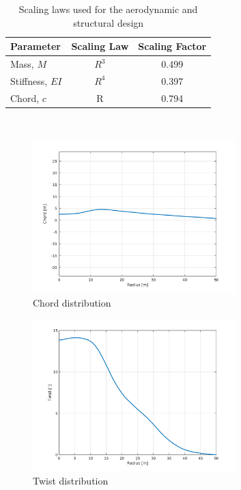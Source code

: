 \begin{table}[h]
\centering
\caption{Scaling laws used for the aerodynamic and structural design}
\label{tab:aero_struct_scaling}
\begin{tabular}{ |l|c|c| } 
\hline
\textbf{Parameter} & \textbf{Scaling Law} & \textbf{Scaling Factor}\\ 
\hline
Mass, $M$ & $R^3$ & 0.499 \\
\hline
Stiffness, $EI$ & $R^4$ & 0.397 \\
\hline
Chord, $c$ & R & 0.794\\
\hline
\end{tabular} \\
\end{table}

\begin{figure}[H]
\centering
\includegraphics[width=0.7\textwidth]{Images/chord.png} 
\caption{Chord distribution}\label{fig:chord}
\end{figure}

\begin{figure}[H]
\centering
\includegraphics[width=0.7\textwidth]{Images/twist.png} 
\caption{Twist distribution}\label{fig:twist}
\end{figure}


